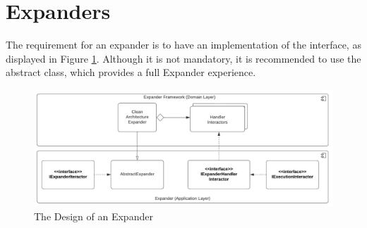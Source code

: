 \section{Expanders}

The requirement for an expander is to have an implementation of the
 interface, as displayed in Figure
\ref{fig_expander_design}. Although it is not mandatory, it is recommended to use the
abstract  class, which provides a full Expander
experience.

\begin{figure}[H]
    \centering
    \includegraphics[width=1\textwidth]{figures/expander.pdf}
    \caption[The Design of an Expander]{The Design of an Expander}
    \label{fig_expander_design}
  \end{figure}